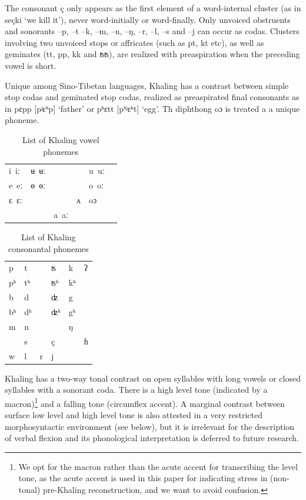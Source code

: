 \documentclass[oldfontcommands,oneside,a4paper,11pt]{article}
\newcommand{\ipa}[1]{{\phon \mbox{#1}}} %
\begin{document}
The consonant \ipa{ç} only appears as the first element of a word-internal cluster (as in \ipa{seçki} `we kill it'), never word-initially or word-finally. Only unvoiced obstruents and sonorants \ipa{--p}, \ipa{--t} \ipa{--k}, \ipa{--m}, \ipa{--n}, \ipa{--ŋ}, \ipa{--r}, \ipa{--l}, \ipa{--s} and \ipa{--j} can occur as codas. Clusters involving two unvoiced stops or affricates (such as \ipa{pt}, \ipa{kt} etc), as well as geminates (\ipa{tt}, \ipa{pp}, \ipa{kk} and \ipa{ʦʦ}), are realized with preaspiration when the preceding vowel is short.

Unique among Sino-Tibetan languages, Khaling has a contrast between simple stop codas and geminated stop codas, realized as preaspirated final consonants as in \ipa{pɛpp} [pʲɛʰp] `father'  or \ipa{pʰɛtt} [pʰʲɛʰt] `egg'. Th diphthong \ipa{oɔ} is treated a a unique phoneme.

\begin{table}[h]
\caption{List of Khaling vowel phonemes} \label{tab:vowels}\centering
\begin{tabular}{llllll}
\ipa{i iː} & \ipa{ʉ ʉː} & &&\ipa{u uː} \\
\ipa{e eː} & \ipa{ɵ ɵː} & &&\ipa{o oː} \\
\ipa{ɛ ɛː} &   & &\ipa{ʌ} &  \ipa{oɔ} \\
&&\ipa{a aː}\\
\end{tabular}
\end{table}

\begin{table}[h]
\caption{List of Khaling consonantal phonemes} \label{tab:consonants}\centering
\begin{tabular}{llllll}
\ipa{p} & \ipa{t} &&\ipa{ʦ}  & \ipa{k}&\ipa{ʔ}\\
\ipa{pʰ} & \ipa{tʰ} &&\ipa{ʦʰ}  & \ipa{kʰ}&\\
\ipa{b} & \ipa{d} &&\ipa{ʣ}  & \ipa{g}&\\
\ipa{bʰ} & \ipa{dʰ} &&\ipa{ʣʰ}  & \ipa{gʰ}&\\
\ipa{m} & \ipa{n} && & \ipa{ŋ}&\\
  & \ipa{s} && \ipa{ç}& &\ipa{ɦ}\\
  \ipa{w} & \ipa{l} &\ipa{r}&\ipa{j}  & &\\
\end{tabular}
\end{table}

Khaling has a two-way tonal contrast on open syllables with long vowels or closed syllables with a sonorant coda. There is a high level tone (indicated by a macron)\footnote{We opt for the macron rather than the acute accent for transcribing the level tone, as the acute accent is used in this paper for indicating stress in (non-tonal) pre-Khaling reconstruction, and we want to avoid confusion.} and a falling tone (circumflex accent). A marginal contrast between surface low level and high level tone is also attested in a very restricted morphosyntactic environment (see below), but it is irrelevant for the description of verbal flexion and its phonological interpretation is deferred to future research.
\end{document}

